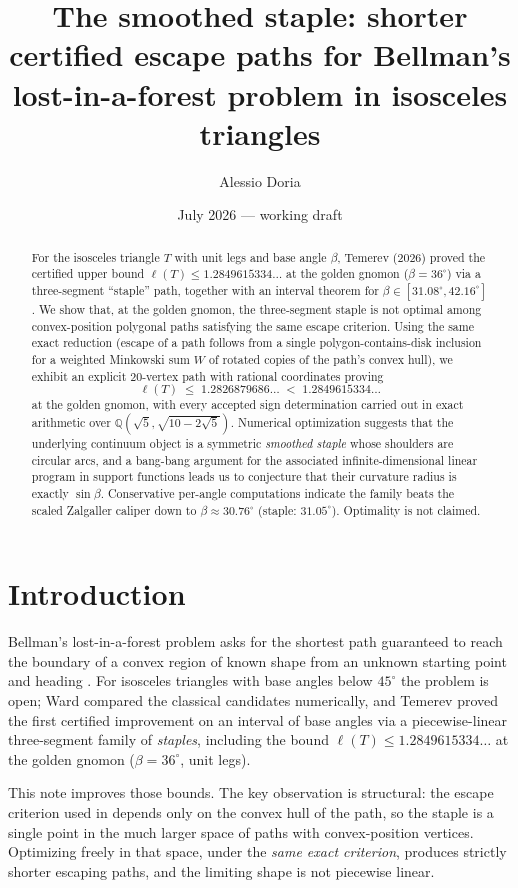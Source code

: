 \documentclass[11pt]{amsart}
\title[The smoothed staple]{The smoothed staple: shorter certified escape
paths for Bellman's lost-in-a-forest problem in isosceles triangles}
\author{Alessio Doria}
\date{July 2026 --- working draft}
\theoremstyle{remark}
\begin{document}
\begin{abstract}
For the isosceles triangle $T$ with unit legs and base angle $\beta$,
Temerev (2026) proved the certified upper bound
$\ell(T)\le 1.2849615334\ldots$ at the golden gnomon
($\beta=36^\circ$) via a three-segment ``staple'' path, together with an
interval theorem for $\beta\in[31.08^\circ,42.16^\circ]$. We show that, at the
golden gnomon, the three-segment staple is not optimal among
convex-position polygonal paths satisfying the same escape criterion. Using the same exact reduction
(escape of a path follows from a single polygon-contains-disk inclusion for
a weighted Minkowski sum $W$ of rotated copies of the path's convex hull),
we exhibit an explicit $20$-vertex path with rational coordinates proving
\[
  \ell(T)\;\le\;1.2826879686\ldots\;<\;1.2849615334\ldots
\]
at the golden gnomon, with every accepted sign determination carried out in
exact arithmetic over $\mathbb{Q}(\sqrt5,\sqrt{10-2\sqrt5})$. Numerical
optimization suggests that the underlying continuum object is a symmetric
\emph{smoothed staple} whose shoulders are circular arcs, and a bang-bang
argument for the
associated infinite-dimensional linear program in support functions leads us
to conjecture that their curvature radius is exactly $\sin\beta$.
Conservative per-angle computations indicate the family beats the scaled
Zalgaller caliper down to $\beta\approx30.76^\circ$ (staple:
$31.05^\circ$). Optimality is not claimed.
\end{abstract}
\maketitle

\section{Introduction}
Bellman's lost-in-a-forest problem asks for the shortest path guaranteed to
reach the boundary of a convex region of known shape from an unknown
starting point and heading \cite{FW04}. For isosceles triangles with base
angles below $45^\circ$ the problem is open; Ward \cite{Ward08} compared the
classical candidates numerically, and Temerev \cite{Tem26} proved the first
certified improvement on an interval of base angles via a piecewise-linear
three-segment family of \emph{staples}, including the bound
$\ell(T)\le 1.2849615334\ldots$ at the golden gnomon
($\beta=36^\circ$, unit legs).

This note improves those bounds. The key observation is structural: the
escape criterion used in \cite{Tem26} depends only on the convex hull of the
path, so the staple is a single point in the much larger space of paths with
convex-position vertices. Optimizing freely in that space, under the
\emph{same exact criterion}, produces strictly shorter escaping paths, and
the limiting shape is not piecewise linear.
\end{document}
